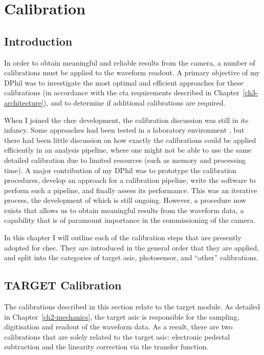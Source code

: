 \chapter{\label{ch5-calibration}Calibration} 

\minitoc

\lstset{language=Python}

\section{Introduction}

In order to obtain meaningful and reliable results from the camera, a number of calibrations must be applied to the waveform readout. A primary objective of my DPhil was to investigate the most optimal and efficient approaches for these calibrations (in accordance with the \gls{cta} requirements described in Chapter~\ref{ch3-architecture}), and to determine if additional calibrations are required.

When I joined the \gls{chec} development, the calibration discussion was still in its infancy. Some approaches had been tested in a laboratory environment \cite{Bechtol2012}, but there had been little discussion on how exactly the calibrations could be applied efficiently in an analysis pipeline, where one might not be able to use the same detailed calibration due to limited resources (such as memory and processing time). A major contribution of my DPhil was to prototype the calibration procedures, develop an approach for a calibration pipeline, write the software to perform such a pipeline, and finally assess its performance. This was an iterative process, the development of which is still ongoing. However, a procedure now exists that allows us to obtain meaningful results from the waveform data, a capability that is of paramount importance in the commissioning of the camera.

In this chapter I will outline each of the calibration steps that are presently adopted for \gls{chec}. They are introduced in the general order that they are applied, and split into the categories of \gls{target} \gls{asic}, photosensor, and ``other'' calibrations.

\section{TARGET Calibration}

The calibrations described in this section relate to the \gls{target} module. As detailed in Chapter~\ref{ch2-mechanics}, the \gls{target} \gls{asic} is responsible for the sampling, digitisation and readout of the waveform data. As a result, there are two calibrations that are solely related to the \gls{target} \gls{asic}: electronic pedestal subtraction and the linearity correction via the transfer function. 

